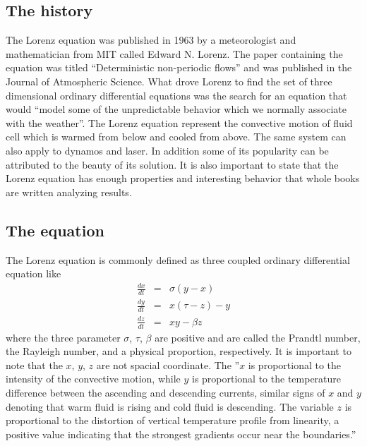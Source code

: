 \documentclass[12pt]{article}
\begin{document}
\subsection{The history}
The Lorenz equation was published in 1963 by a meteorologist and mathematician from MIT called Edward N. Lorenz.  The paper containing the equation was  titled ``Deterministic non-periodic flows'' and was published in the Journal of Atmospheric Science.  What drove Lorenz to find the set of three dimensional ordinary differential equations was the search for an equation that would ``model some of the unpredictable behavior which we normally associate with the weather''\cite{2}.  The Lorenz equation represent the convective motion of fluid cell which is warmed from below and cooled from above.\cite{2} The same system can also apply to dynamos and laser.  In addition some of its popularity can be attributed to the beauty of its solution.  It is also important to state that the Lorenz equation has enough properties and interesting behavior that whole books are written analyzing results.  

\subsection{The equation}
The Lorenz equation is commonly defined as three coupled ordinary differential equation like 
\begin{eqnarray*}
\frac{dx}{dt} & = & \sigma(y-x)\\
\frac{dy}{dt} & = & x(\tau - z) -y\\
\frac{dz}{dt} & = & xy - \beta z
\end{eqnarray*}
where the three parameter $\sigma$, $\tau$, $\beta$ are positive and are called the Prandtl number, the Rayleigh number, and a physical proportion, respectively.  It is important to note that the $x$, $y$, $z$ are not spacial coordinate.  The ''$x$ is proportional to the intensity of the convective motion, while $y$ is proportional to the temperature difference between the ascending and descending currents, similar signs of $x$ and $y$ denoting that warm fluid is rising and cold fluid is descending.  The variable $z$ is proportional to the distortion of vertical temperature profile from linearity, a positive value indicating that the strongest gradients occur near the boundaries.'' \cite{1}\\
\end{document}
